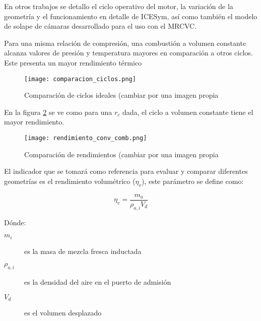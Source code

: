 En otros trabajos se detallo el ciclo operativo del motor, la variación de la
geometría y el funcionamiento en detalle de ICESym, así como también el modelo
de solape de cámaras desarrollado para el uso con el MRCVC.
%

Para una misma relación de compresión, una combustión a volumen constante
alcanza valores de presión y temperatura mayores en comparación a otros ciclos.
%
Este presenta un mayor rendimiento térmico
\begin{figure}
    \centering
    \texttt{[image: comparacion\_ciclos.png]}
    \caption{Comparación de ciclos ideales (cambiar por una imagen propia}
    \label{fig:comparacion_ciclos}
\end{figure}

En la figura \ref{fig:comparacion_rendimientos} se ve como para una $r_c$ dada,
el ciclo a volumen constante tiene el mayor rendimiento.

\begin{figure}
    \centering
    \texttt{[image: rendimiento\_conv\_comb.png]}
    \caption{Comparación de rendimientos (cambiar por una imagen propia}
    \label{fig:comparacion_rendimientos}
\end{figure}


%
%
%
%

El indicador que se tomará como referencia para evaluar y comparar diferentes
geometrías es el rendimiento volumétrico ($\eta_v$), este parámetro se define
como:

\begin{equation}
    \eta_v = \frac{m_a}{\rho_{a,i}V_d}
\end{equation}

Dónde:
%
\begin{description}
    \item[$m_i$] es la masa de mezcla fresca inductada
    \item[$\rho_{a,i}$] es la densidad del aire en el puerto de admisión
    \item[$V_d$] es el volumen desplazado
\end{description}

